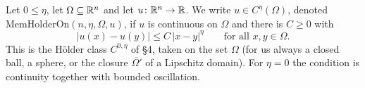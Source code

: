 \begin{definition}
Let $0\le\eta$, let $\Omega\subseteq\mathbb{R}^n$ and let $u\colon\mathbb{R}^n\to\mathbb{R}$.  We write
$u\in C^\eta(\Omega)$, denoted $\mathrm{MemHolderOn}(n,\eta,\Omega,u)$, if $u$ is
continuous on $\Omega$ and there is $C\ge0$ with
\[
|u(x)-u(y)|\le C\,|x-y|^{\eta}\qquad\text{for all }x,y\in\Omega .
\]
This is the H\"older class $C^{0,\eta}$ of \S4, taken on the set $\Omega$ (for us
always a closed ball, a sphere, or the closure $\overline{\Omega'}$ of a
Lipschitz domain).  For $\eta=0$ the condition is continuity together with
bounded oscillation.
\end{definition}
